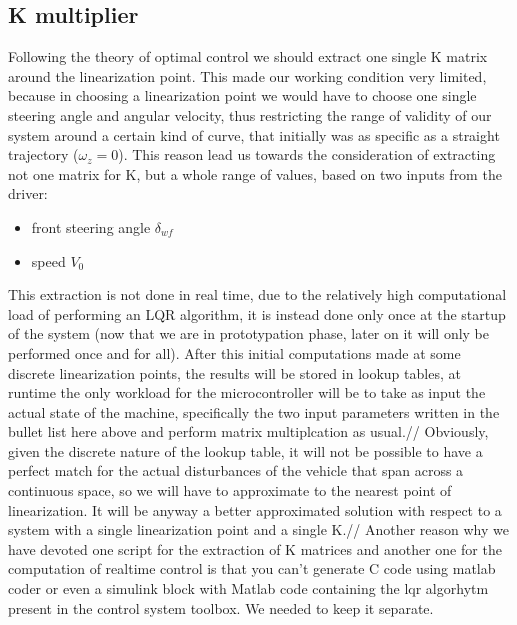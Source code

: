 \documentclass[a4paper,12pt,titlepage]{report}
\numberwithin{figure}{section}
\begin{document}
\subsection{K multiplier}
Following the theory of optimal control we should extract one single K matrix around the linearization point. This made our working condition very limited, because in choosing a linearization point we would have to choose one single steering angle and angular velocity, thus restricting the range of validity of our system around a certain kind of curve, that initially was as specific as a straight trajectory ($\omega_{z}=0$).
This reason lead us towards the consideration of extracting not one matrix for K, but a whole range of values, based on two inputs from the driver:
\begin{itemize}
	\item front steering angle $\delta_{wf}$
	\item speed $V_0$
\end{itemize}	
This extraction is not done in real time, due to the relatively high computational load of performing an LQR algorithm, it is instead done only once at the startup of the system (now that we are in prototypation phase, later on it will only be performed once and for all). After this initial computations made at some discrete linearization points, the results will be stored in lookup tables, at runtime the only workload for the microcontroller will be to take as input the actual state of the machine, specifically the two input parameters written in the bullet list here above and perform matrix multiplcation as usual.//
Obviously, given the discrete nature of the lookup table, it will not be possible to have a perfect match for the actual disturbances of the vehicle that span across a continuous space, so we will have to approximate to the nearest point of linearization. It will be anyway a better approximated solution with respect to a system with a single linearization point and a single K.//
Another reason why we have devoted one script for the extraction of K matrices and another one for the computation of realtime control is that you can't generate C code using matlab coder or even a simulink block with Matlab code containing the lqr algorhytm present in the control system toolbox. We needed to keep it separate.
\end{document}
